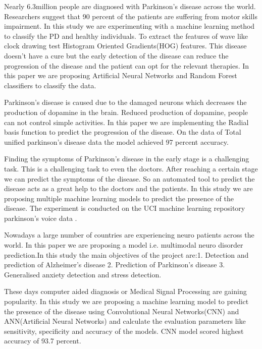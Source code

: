 \documentclass[conference]{IEEEtran}
\begin{document}
Nearly 6.3million people are diagnosed with Parkinson's disease across the world. Researchers suggest that 90  percent of the patients are suffering from motor skills impairment. In this study we are experimenting with a machine learning method to classify the PD and healthy individuals. To extract the features of wave like clock drawing test Histogram Oriented Gradients(HOG) features. This disease doesn’t have a cure but the early detection of the disease can reduce the progression of the disease and the patient can opt for the relevant therapies. In this paper we are proposing Artificial Neural Networks and Random Forest classifiers to classify the data\cite{10047447}.

Parkinson’s disease is caused due to the damaged neurons which decreases the production of dopamine in the brain. Reduced production of dopamine, people can not control simple activities. In this paper we are implementing the Radial basis function to predict the progression of the disease. On the data of Total unified parkinson’s disease data the model achieved 97 percent accuracy\cite{9971828}.

Finding the symptoms of Parkinson’s disease in the early stage is a challenging task. This is a challenging task to even the doctors. After reaching a certain stage we can predict the symptoms of the disease. So an automated tool to predict the disease acts as a great help to the doctors and the patients. In this study we are proposing multiple machine learning models to predict the presence of the disease. The experiment is conducted on the UCI machine learning repository parkinson’s voice data \cite{9298033}.

Nowadays a large number of countries are experiencing neuro patients across the world. In this paper we are proposing a model i.e. multimodal neuro disorder prediction.In this study the main objectives of the project are:1. Detection and prediction of Alzheimer’s disease 2. Prediction of Parkinson’s disease 3. Generalised anxiety detection and stress detection\cite{10007434}.

These days computer aided diagnosis or Medical Signal Processing are gaining popularity. In this study we are proposing a machine learning model to predict the presence of the disease using Convolutional Neural Networks(CNN) and ANN(Artificial Neural Networks) and calculate the evaluation parameters like sensitivity, specificity and accuracy of the models. CNN model scored highest accuracy of 93.7 percent\cite{9493456}.
\end{document}
